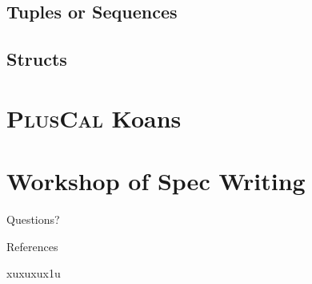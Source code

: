 \documentclass[10pt]{beamer}
\newcommand{\pluscal}{\textbf{\textsc{PlusCal}}\xspace}
\begin{document}
\subsection{Tuples or Sequences}

\subsection{Structs}


\section{\pluscal Koans}

\section{Workshop of Spec Writing}


\begin{frame}[standout]
  Questions?
\end{frame}

\appendix

\begin{frame}[allowframebreaks]{References}

  \nocite{*}  xuxuxux1u
  

\end{frame}
\end{document}
